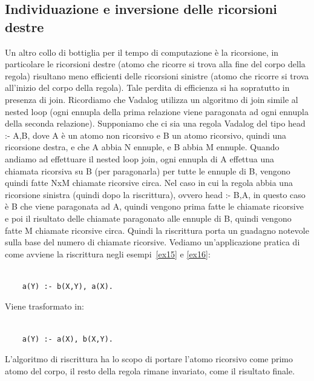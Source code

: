 \subsection{Individuazione e inversione delle ricorsioni destre}

Un altro collo di bottiglia per il tempo di computazione è la ricorsione, in particolare le ricorsioni destre (atomo che ricorre si trova alla fine del corpo della regola) risultano meno efficienti delle ricorsioni sinistre (atomo che ricorre si trova all'inizio del corpo della regola). \newline
Tale perdita di efficienza si ha sopratutto in presenza di join. Ricordiamo che Vadalog utilizza un algoritmo di join simile al nested loop (ogni ennupla della prima relazione viene paragonata ad ogni ennupla della seconda relazione). \newline
Supponiamo che ci sia una regola Vadalog del tipo head :- A,B, dove A è un atomo non ricorsivo e B un atomo ricorsivo, quindi una ricorsione destra, e che A abbia N ennuple, e B abbia M ennuple. \newline
Quando andiamo ad effettuare il nested loop join, ogni ennupla di A effettua una chiamata ricorsiva su B (per paragonarla) per tutte le ennuple di B, vengono quindi fatte NxM chiamate ricorsive circa. \newline
Nel caso in cui la regola abbia una ricorsione sinistra (quindi dopo la riscrittura), ovvero head :- B,A, in  questo caso è B che viene paragonata ad A, quindi vengono prima fatte le chiamate ricorsive e poi il risultato delle chiamate paragonato alle ennuple di B, quindi vengono fatte M chiamate ricorsive circa. Quindi la riscrittura porta un guadagno notevole sulla base del numero di chiamate ricorsive. \newline
Vediamo un'applicazione pratica di come avviene la riscrittura negli esempi~\ref{ex15} e \ref{ex16}: 
\begin{example}\label{ex15}
\normalfont
{}
	\begin{lstlisting}
	
	a(Y) :- b(X,Y), a(X).
	\end{lstlisting}
\end{example}
Viene trasformato in:
\begin{example}\label{ex16}
\normalfont
{}
	\begin{lstlisting}
	
	a(Y) :- a(X), b(X,Y).
	\end{lstlisting}
\end{example}
L'algoritmo di riscrittura ha lo scopo di portare l'atomo ricorsivo come primo atomo del corpo, il resto della regola rimane invariato, come il risultato finale.

